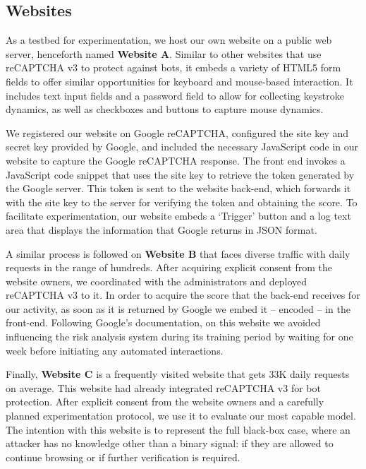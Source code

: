 \subsection{Websites}

As a testbed for experimentation, we host our own website on a public web server, henceforth named \textbf{Website A}.
Similar to other websites that use reCAPTCHA v3 to protect against bots, it embeds a variety of HTML5 form fields to offer similar opportunities for keyboard and mouse-based interaction.
It includes text input fields and a password field to allow for collecting keystroke dynamics, as well as checkboxes and buttons to capture mouse dynamics.

We registered our website on Google reCAPTCHA, configured the site key and secret key provided by Google, and included the necessary JavaScript code in our website to capture the Google reCAPTCHA response.
The front end invokes a JavaScript code snippet that uses the site key to retrieve the token generated by the Google server.
This token is sent to the website back-end, which forwards it with the site key to the server for verifying the token and obtaining the score.
To facilitate experimentation, our website embeds a `Trigger' button and a log text area that displays the information that Google returns in JSON format.

A similar process is followed on \textbf{Website B} that faces diverse traffic with daily requests in the range of hundreds.
After acquiring explicit consent from the website owners, we coordinated with the administrators and deployed reCAPTCHA v3 to it.
In order to acquire the score that the back-end receives for our activity, as soon as it is returned by Google we embed it -- encoded -- in the front-end.
Following Google's documentation, on this website we avoided influencing the risk analysis system during its training period by waiting for one week before initiating any automated interactions.

Finally, \textbf{Website C} is a frequently visited website that gets 33K daily requests on average.
This website had already integrated reCAPTCHA v3 for bot protection.
After explicit consent from the website owners and a carefully planned experimentation protocol, we use it to evaluate our most capable model.
The intention with this website is to represent the full black-box case, where an attacker has no knowledge other than a binary signal: if they are allowed to continue browsing or if further verification is required.


